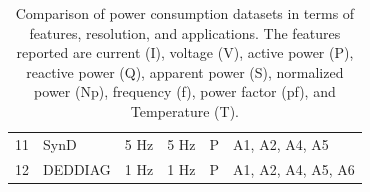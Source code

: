 \begin{table}
{\begin{tabular}{llllll}
            11                  & SynD                     & 5 Hz                           & 5 Hz                      & P                             & A1, A2, A4, A5         \\
            12                  & DEDDIAG                  & 1 Hz                           & 1 Hz                      & P                             & A1, A2, A4, A5, A6     \\ \hline
        \end{tabular}}
    \caption[Comparison of power consumption datasets in terms of features, resolution, and applications]{Comparison of power consumption datasets in terms of features, resolution, and applications. The features reported are current (I), voltage (V), active power (P), reactive power (Q), apparent power (S), normalized power (Np), frequency (f), power factor (pf), and Temperature (T).}
    \label{tab:datasets_applications}
\end{table}